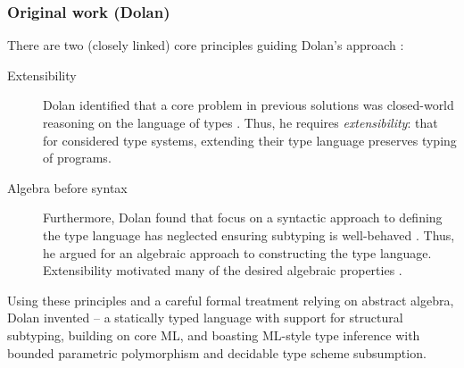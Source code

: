 \subsubsection{Original work (Dolan)}
\label{subsubsec:dolan}

There are two (closely linked) core principles guiding Dolan's approach \cite[Section~1.3]{dolan-thesis}: \begin{description}
    \item[Extensibility] Dolan identified that a core problem in previous solutions was closed-world reasoning on the language of types \cite[Section~1.3.1]{dolan-thesis}. Thus, he requires \emph{extensibility}: that for considered type systems, extending their type language preserves typing of programs.
    \item[Algebra before syntax] Furthermore, Dolan found that focus on a syntactic approach to defining the type language has neglected ensuring subtyping is well-behaved \cite[Section~1.3.2]{dolan-thesis}. Thus, he argued for an algebraic approach to constructing the type language. Extensibility motivated many of the desired algebraic properties \cite[Section~2.1.5]{dolan-thesis}.
\end{description}
Using these principles and a careful formal treatment relying on abstract algebra, Dolan invented \mlsub{} -- a statically typed language with support for structural subtyping, building on core ML, and boasting ML-style type inference with bounded parametric polymorphism and decidable type scheme subsumption.

